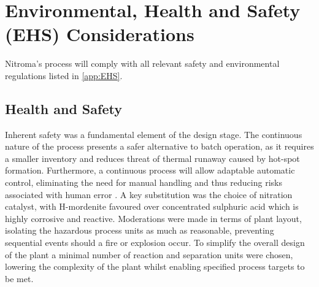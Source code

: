 \section{Environmental, Health and Safety (EHS) Considerations}
\label{sec:ehs}


Nitroma's process will comply with all relevant safety and environmental regulations listed in \cref{app:EHS}. 

\subsection{Health and Safety}
Inherent safety was a fundamental element of the design stage. The continuous nature of the process presents a safer alternative to batch operation, as it requires a smaller inventory and reduces threat of thermal runaway caused by hot-spot formation. Furthermore, a continuous process will allow adaptable automatic control, eliminating the need for manual handling and thus reducing risks associated with human error \cite{mannan_lees_2012}. A key substitution was the choice of nitration catalyst, with H-mordenite favoured over concentrated sulphuric acid which is highly corrosive and reactive. Moderations were made in terms of plant layout, isolating the hazardous process units as much as reasonable, preventing sequential events should a fire or explosion occur. To simplify the overall design of the plant a minimal number of reaction and separation units were chosen, lowering the complexity of the plant whilst enabling specified process targets to be met. 


